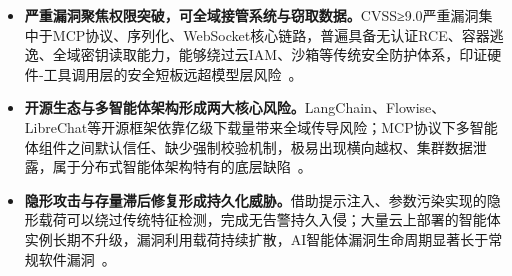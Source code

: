 \begin{itemize}[tabitem]
 \item \textbf{严重漏洞聚焦权限突破，可全域接管系统与窃取数据。}CVSS≥9.0严重漏洞集中于MCP协议、序列化、WebSocket核心链路，普遍具备无认证RCE、容器逃逸、全域密钥读取能力，能够绕过云IAM、沙箱等传统安全防护体系，印证硬件‑工具调用层的安全短板远超模型层风险~\cite{nvdCVE2026_26015,nvdCVE2026_22252}。
 
 \item \textbf{开源生态与多智能体架构形成两大核心风险。}LangChain、Flowise、LibreChat等开源框架依靠亿级下载量带来全域传导风险；MCP协议下多智能体组件之间默认信任、缺少强制校验机制，极易出现横向越权、集群数据泄露，属于分布式智能体架构特有的底层缺陷~\cite{nvdCVE2025_59528,nvdCVE2026_30625}。
 
 \item \textbf{隐形攻击与存量滞后修复形成持久化威胁。}借助提示注入、参数污染实现的隐形载荷可以绕过传统特征检测，完成无告警持久入侵；大量云上部署的智能体实例长期不升级，漏洞利用载荷持续扩散，AI智能体漏洞生命周期显著长于常规软件漏洞~\cite{nvdCVE2026_30615,nvdCVE2026_34070}。
\end{itemize}

\begingroup
\enlargethispage{1cm}
\footnotesize
\centering


